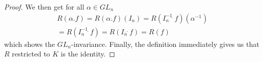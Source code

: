\begin{proof}
  We then get for all $ \alpha \in GL_n $
  \begin{equation}
    \begin{aligned}
      R \left( \alpha . f \right)
      = R \left( \alpha . f \right) \left( I_n \right)
      = R \left( I_n^{-1} \dot{\phantom{.}} f \right) \left( \alpha^{-1} \right) \\
      = R \left( I_n^{-1} \dot{\phantom{.}} f \right)
      = R \left( I_n \dot{\phantom{.}} f \right) 
      = R (f)
  \end{aligned}
  \end{equation}
  which shows the $GL_n$-invariance.
  Finally, the definition immediately gives us that $R$ restricted to $K$ is the identity.
\end{proof}

